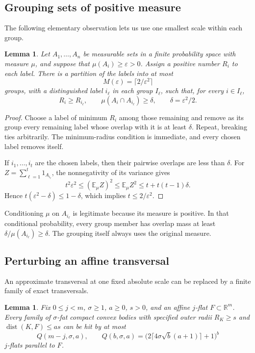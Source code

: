 \documentclass[11pt]{article}
\newtheorem{lemma}[theorem]{Lemma}
\theoremstyle{remark}
\newcommand{\R}{\mathbb R}
\newcommand{\eps}{\varepsilon}
\newcommand{\dist}{\operatorname{dist}}
\begin{document}
\subsection{Grouping sets of positive measure}

The following elementary observation lets us use one smallest scale
within each group.

\begin{lemma}
\label{lem:grouping}
Let \(A_1,\ldots,A_n\) be measurable sets in a finite probability space
with measure \(\mu\), and suppose that \(\mu(A_i)\geq\eps>0\).
Assign a positive number \(R_i\) to each label.
There is a partition of the labels into at most
\[
 M(\eps)=\lceil2/\eps^2\rceil
\]
groups, with a distinguished label \(i_\ell\) in each group \(I_\ell\),
such that, for every \(i\in I_\ell\),
\[
 R_i\geq R_{i_\ell},
 \qquad \mu(A_i\cap A_{i_\ell})\geq\delta,
 \qquad \delta=\eps^2/2.
\]
\end{lemma}

\begin{proof}
Choose a label of minimum \(R_i\) among those remaining and remove as
its group every remaining label whose overlap with it is at least
\(\delta\). Repeat, breaking ties arbitrarily.
The minimum-radius condition is immediate, and every chosen label
removes itself.

If \(i_1,\ldots,i_t\) are the chosen labels, then their pairwise overlaps
are less than \(\delta\). For
\(Z=\sum_{\ell=1}^t1_{A_{i_\ell}}\), the nonnegativity of its variance
gives
\[
 t^2\eps^2\leq(\mathbb E_\mu Z)^2
 \leq\mathbb E_\mu Z^2
 \leq t+t(t-1)\delta.
\]
Hence \(t(\eps^2-\delta)\leq1-\delta\), which implies
\(t\leq2/\eps^2\).
\end{proof}

Conditioning \(\mu\) on \(A_{i_\ell}\) is legitimate because its measure
is positive. In that conditional probability, every group member has
overlap mass at least
\(\delta/\mu(A_{i_\ell})\geq\delta\).
The grouping itself always uses the original measure.

\subsection{Perturbing an affine transversal}

An approximate transversal at one fixed absolute scale can be replaced
by a finite family of exact transversals.

\begin{lemma}
\label{lem:euclidean-rounding}
Fix \(0\leq j<m\), \(\sigma\geq1\), \(a\geq0\), \(s>0\), and an affine
\(j\)-flat \(F\subset\R^m\).
Every family of \(\sigma\)-fat compact convex bodies with specified
outer radii \(R_K\geq s\) and
\(\dist(K,F)\leq as\) can be hit by at most
\begin{equation}
 Q(m-j,\sigma,a),\qquad
 Q(b,\sigma,a)=
 \bigl(2\lceil4\sigma\sqrt b(a+1)\rceil+1\bigr)^b
 \label{eq:Q}
\end{equation}
\(j\)-flats parallel to \(F\).
\end{lemma}
\end{document}
